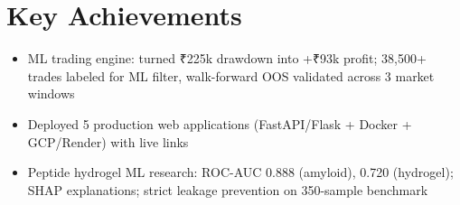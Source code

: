 \documentclass[11pt,a4paper]{article}
\begin{document}
\section*{Key Achievements}
\begin{itemize}
    \item ML trading engine: turned ₹225k drawdown into +₹93k profit; 38,500+ trades labeled for ML filter, walk-forward OOS validated across 3 market windows
    \item Deployed 5 production web applications (FastAPI/Flask + Docker + GCP/Render) with live links
    \item Peptide hydrogel ML research: ROC-AUC 0.888 (amyloid), 0.720 (hydrogel); SHAP explanations; strict leakage prevention on 350-sample benchmark
\end{itemize}
\end{document}
